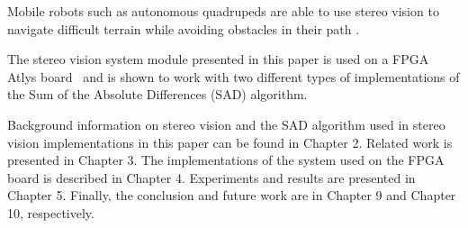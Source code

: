 Mobile robots such as autonomous quadrupeds are able to use stereo vision to navigate difficult terrain while avoiding obstacles in their path \cite{quadRobot}.

The stereo vision system module presented in this paper is used on a FPGA Atlys board~\cite{atlysBoard} and is shown to work with two different types of implementations of the Sum of the Absolute Differences (SAD) algorithm. 

Background information on stereo vision and the SAD algorithm used in stereo vision implementations in this paper can be found in Chapter 2. Related work is presented in Chapter 3. The implementations of the system used on the FPGA board is described in Chapter 4. Experiments and results are presented in Chapter 5. Finally, the conclusion and future work are in Chapter 9 and Chapter 10, respectively.